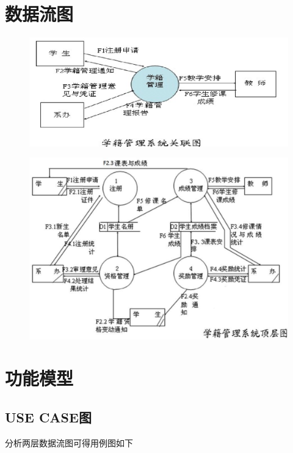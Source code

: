 \documentclass[12pt, a4paper, oneside]{ctexart}
\begin{document}
\section{数据流图}

\begin{figure}[H]
    \centering
    \includegraphics[width = 1\textwidth]{../pic/1/1.1.png}
\end{figure}

\begin{figure}[H]
    \centering
    \includegraphics[width = 1\textwidth]{../pic/1/1.2.png}
\end{figure}

\section{功能模型}

\subsection{USE CASE图}

分析两层数据流图可得用例图如下
\end{document}
